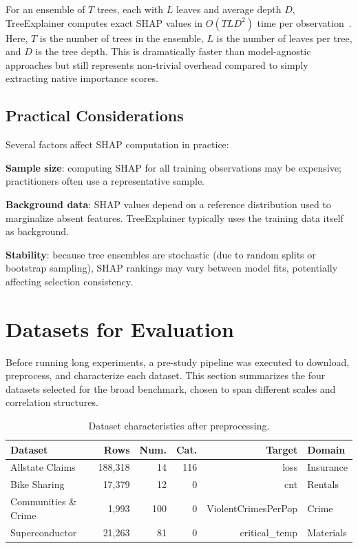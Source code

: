 For an ensemble of $T$ trees, each with $L$ leaves and average depth $D$, TreeExplainer computes exact SHAP values in $O(TLD^2)$ time per observation~\cite{lundberg2020local}. Here, $T$ is the number of trees in the ensemble, $L$ is the number of leaves per tree, and $D$ is the tree depth. This is dramatically faster than model-agnostic approaches but still represents non-trivial overhead compared to simply extracting native importance scores.

\subsection{Practical Considerations}

Several factors affect SHAP computation in practice:

\textbf{Sample size}: computing SHAP for all training observations may be expensive; practitioners often use a representative sample.

\textbf{Background data}: SHAP values depend on a reference distribution used to marginalize absent features. TreeExplainer typically uses the training data itself as background.

\textbf{Stability}: because tree ensembles are stochastic (due to random splits or bootstrap sampling), SHAP rankings may vary between model fits, potentially affecting selection consistency.

\section{Datasets for Evaluation}

Before running long experiments, a pre-study pipeline was executed to download, preprocess, and characterize each dataset. This section summarizes the four datasets selected for the broad benchmark, chosen to span different scales and correlation structures.

\begin{table}[h]
\centering
\caption{Dataset characteristics after preprocessing.}
\label{tab:datasets}
\begin{tabular}{lrrrrl}
\toprule
\textbf{Dataset} & \textbf{Rows} & \textbf{Num.} & \textbf{Cat.} & \textbf{Target} & \textbf{Domain} \\
\midrule
Allstate Claims~\cite{gaurallstate} & 188,318 & 14 & 116 & loss & Insurance \\
Bike Sharing~\cite{fanaee2014event} & 17,379 & 12 & 0 & cnt & Rentals \\
Communities \& Crime~\cite{redmond2002data} & 1,993 & 100 & 0 & ViolentCrimesPerPop & Crime \\
Superconductor~\cite{hamidieh2018superconductor} & 21,263 & 81 & 0 & critical\_temp & Materials \\
\bottomrule
\end{tabular}
\end{table}

